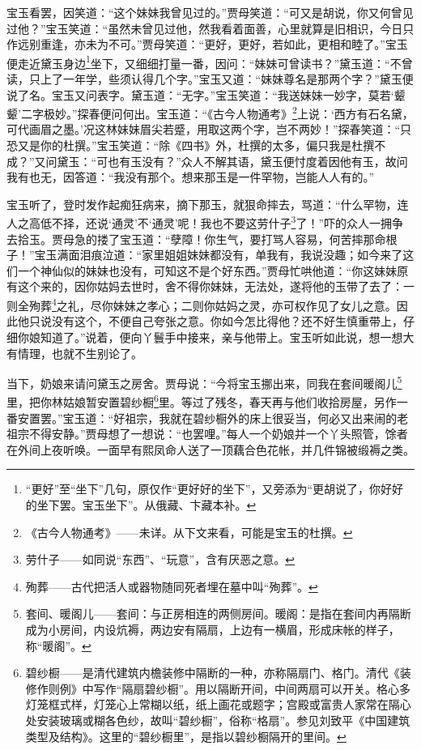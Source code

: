 \par 宝玉看罢，因笑道：“这个妹妹我曾见过的。”贾母笑道：“可又是胡说，你又何曾见过他？”宝玉笑道：“虽然未曾见过他，然我看着面善，心里就算是旧相识，今日只作远别重逢，亦未为不可。”贾母笑道：“更好，更好，若如此，更相和睦了。”宝玉便走近黛玉身边\footnote{“更好”至“坐下”几句，原仅作“更好好的坐下”，又旁添为“更胡说了，你好好的坐下罢。宝玉坐下”。从俄藏、卞藏本补。}坐下，又细细打量一番，因问：“妹妹可曾读书？”黛玉道：“不曾读，只上了一年学，些须认得几个字。”宝玉又道：“妹妹尊名是那两个字？”黛玉便说了名。宝玉又问表字。黛玉道：“无字。”宝玉笑道：“我送妹妹一妙字，莫若‘颦颦’二字极妙。”探春便问何出。宝玉道：“《古今人物通考》\footnote{《古今人物通考》——未详。从下文来看，可能是宝玉的杜撰。}上说：‘西方有石名黛，可代画眉之墨。’况这林妹妹眉尖若蹙，用取这两个字，岂不两妙！”探春笑道：“只恐又是你的杜撰。”宝玉笑道：“除《四书》外，杜撰的太多，偏只我是杜撰不成？”又问黛玉：“可也有玉没有？”众人不解其语，黛玉便忖度着因他有玉，故问我有也无，因答道：“我没有那个。想来那玉是一件罕物，岂能人人有的。”
\par 宝玉听了，登时发作起痴狂病来，摘下那玉，就狠命摔去，骂道：“什么罕物，连人之高低不择，还说‘通灵’不‘通灵’呢！我也不要这劳什子\footnote{劳什子——如同说“东西”、“玩意”，含有厌恶之意。}了！”吓的众人一拥争去拾玉。贾母急的搂了宝玉道：“孽障！你生气，要打骂人容易，何苦摔那命根子！”宝玉满面泪痕泣道：“家里姐姐妹妹都没有，单我有，我说没趣；如今来了这们一个神仙似的妹妹也没有，可知这不是个好东西。”贾母忙哄他道：“你这妹妹原有这个来的，因你姑妈去世时，舍不得你妹妹，无法处，遂将他的玉带了去了：一则全殉葬\footnote{殉葬——古代把活人或器物随同死者埋在墓中叫“殉葬”。}之礼，尽你妹妹之孝心；二则你姑妈之灵，亦可权作见了女儿之意。因此他只说没有这个，不便自己夸张之意。你如今怎比得他？还不好生慎重带上，仔细你娘知道了。”说着，便向丫鬟手中接来，亲与他带上。宝玉听如此说，想一想大有情理，也就不生别论了。
\par 当下，奶娘来请问黛玉之房舍。贾母说：“今将宝玉挪出来，同我在套间暖阁儿\footnote{套间、暖阁儿——套间：与正房相连的两侧房间。暖阁：是指在套间内再隔断成为小房间，内设炕褥，两边安有隔扇，上边有一横眉，形成床帐的样子，称“暖阁”。}里，把你林姑娘暂安置碧纱橱\footnote{碧纱橱——是清代建筑内檐装修中隔断的一种，亦称隔扇门、格门。清代《装修作则例》中写作“隔扇碧纱橱”。用以隔断开间，中间两扇可以开关。格心多灯笼框式样，灯笼心上常糊以纸，纸上画花或题字；宫殿或富贵人家常在隔心处安装玻璃或糊各色纱，故叫“碧纱橱”，俗称“格扇”。参见刘致平《中国建筑类型及结构》。这里的“碧纱橱里”，是指以碧纱橱隔开的里间。}里。等过了残冬，春天再与他们收拾房屋，另作一番安置罢。”宝玉道：“好祖宗，我就在碧纱橱外的床上很妥当，何必又出来闹的老祖宗不得安静。”贾母想了一想说：“也罢哩。”每人一个奶娘并一个丫头照管，馀者在外间上夜听唤。一面早有熙凤命人送了一顶藕合色花帐，并几件锦被缎褥之类。

